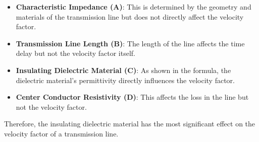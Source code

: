 \begin{itemize}
    \item \textbf{Characteristic Impedance (A)}: This is determined by the geometry and materials of the transmission line but does not directly affect the velocity factor.
    \item \textbf{Transmission Line Length (B)}: The length of the line affects the time delay but not the velocity factor itself.
    \item \textbf{Insulating Dielectric Material (C)}: As shown in the formula, the dielectric material's permittivity directly influences the velocity factor.
    \item \textbf{Center Conductor Resistivity (D)}: This affects the loss in the line but not the velocity factor.
\end{itemize}

Therefore, the insulating dielectric material has the most significant effect on the velocity factor of a transmission line.

